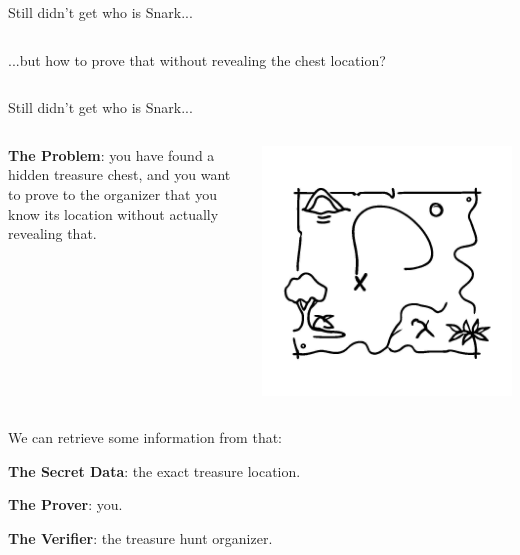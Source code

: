\documentclass{beamer}
\begin{document}
\begin{frame}{Still didn't get who is Snark...}
\begin{columns}
            \begin{column}{0.7\textwidth}
                ...but how to prove that without revealing the chest location?
            \end{column}
        \end{columns}
    \end{frame}

    \begin{frame}{Still didn't get who is Snark...}
        \begin{columns}
            \begin{column}{0.65\textwidth}
                \textbf{The Problem}: you have found a hidden treasure chest, and you want to 
                prove to the organizer that you know its location without actually revealing that.
            \end{column}

            \begin{column}{0.3\textwidth}
                \includegraphics[width=\textwidth]{../presentations/images/lecture_8/treasurelocation.jpg}
            \end{column}
        \end{columns}

        \pause

        We can retrieve some information from that:

        \vspace{0.1cm}
        \textbf{The Secret Data}: the exact treasure location.

        \vspace{0.1cm}
        \textbf{The Prover}: you.

        \vspace{0.1cm}
        \textbf{The Verifier}: the treasure hunt organizer.
    \end{frame}
\end{document}
